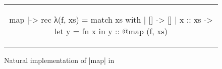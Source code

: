 \begin{figure}[tp]
\begin{tabular}{c}
\begin{Datalang}
map |-> rec λ(f, xs) = match xs with
                       | [] -> []
                       | x :: xs -> let y = fn x in y :: @map (f, xs)
\end{Datalang}
\end{tabular}
\caption{Natural implementation of \datalang|map| in \DataLang}
\label{fig:map}
\end{figure}